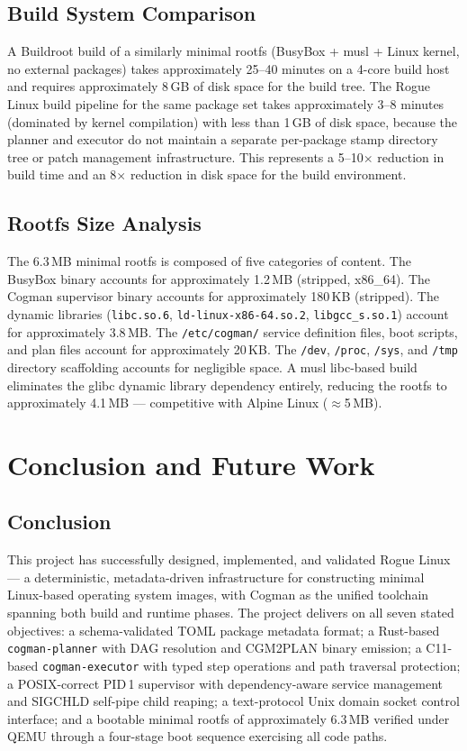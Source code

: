 \documentclass[12pt,a4paper]{report}
\begin{document}
\section{Build System Comparison}

A Buildroot build of a similarly minimal rootfs (BusyBox + musl + Linux kernel,
no external packages) takes approximately 25--40 minutes on a 4-core build host
and requires approximately 8\,GB of disk space for the build tree. The Rogue Linux
build pipeline for the same package set takes approximately 3--8 minutes
(dominated by kernel compilation) with less than 1\,GB of disk space, because the
planner and executor do not maintain a separate per-package stamp directory tree or
patch management infrastructure. This represents a 5--10$\times$ reduction in
build time and an 8$\times$ reduction in disk space for the build environment.

\section{Rootfs Size Analysis}

The 6.3\,MB minimal rootfs is composed of five categories of content. The BusyBox
binary accounts for approximately 1.2\,MB (stripped, x86\_64). The Cogman
supervisor binary accounts for approximately 180\,KB (stripped). The dynamic
libraries (\texttt{libc.so.6}, \texttt{ld-linux-x86-64.so.2},
\texttt{libgcc\_s.so.1}) account for approximately 3.8\,MB. The
\texttt{/etc/cogman/} service definition files, boot scripts, and plan files
account for approximately 20\,KB. The \texttt{/dev}, \texttt{/proc},
\texttt{/sys}, and \texttt{/tmp} directory scaffolding accounts for negligible
space. A musl libc-based build eliminates the glibc dynamic library dependency
entirely, reducing the rootfs to approximately 4.1\,MB --- competitive with Alpine
Linux ($\approx$5\,MB).

\chapter{Conclusion and Future Work}

\section{Conclusion}

This project has successfully designed, implemented, and validated Rogue Linux ---
a deterministic, metadata-driven infrastructure for constructing minimal
Linux-based operating system images, with Cogman as the unified toolchain spanning
both build and runtime phases. The project delivers on all seven stated objectives:
a schema-validated TOML package metadata format; a Rust-based
\texttt{cogman-planner} with DAG resolution and CGM2PLAN binary emission; a
C11-based \texttt{cogman-executor} with typed step operations and path traversal
protection; a POSIX-correct PID\,1 supervisor with dependency-aware service
management and SIGCHLD self-pipe child reaping; a text-protocol Unix domain socket
control interface; and a bootable minimal rootfs of approximately 6.3\,MB verified
under QEMU through a four-stage boot sequence exercising all code paths.
\end{document}

